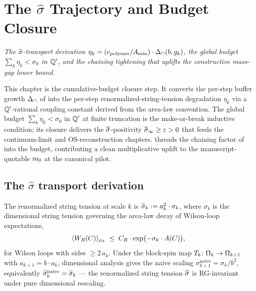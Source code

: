 %

\chapter{The
  \texorpdfstring{$\widehat\sigma$}{sigma-hat} Trajectory and
  Budget Closure}
\label{ch:sigma-hat-trajectory}

\noindent\emph{The $\widehat{\sigma}$-transport derivation
$\eta_k = (c_{\mathrm{polymer}} / A_{\min}) \cdot \Delta_{\cap}(b, g_k)$, the global
budget $\sum_k \eta_k < \sigma_0$ in $\mathbb{Q}'$, and the chaining
tightening that uplifts the constructive mass-gap lower bound.}

This chapter is the cumulative-budget closure step.  It converts
the per-step buffer growth $\Delta_{\cap}$ of  into the
per-step renormalized-string-tension degradation $\eta_k$ via a
$\mathbb{Q}'$-rational coupling constant derived from the area-law
convention.  The global budget $\sum_k \eta_k < \sigma_0$ in $\mathbb{Q}'$
at finite truncation is the make-or-break inductive condition; its
closure delivers the $\widehat{\sigma}$-positivity $\widehat{\sigma}_\infty \ge \varepsilon
> 0$ that feeds the continuum-limit and OS-reconstruction chapters.
 threads the chaining factor of
 into the budget, contributing a clean
multiplicative uplift to the manuscript-quotable $m_0$ at the
canonical pilot.

\section{The
  \texorpdfstring{$\widehat\sigma$}{sigma-hat} transport derivation}
\label{sec:sigma-hat-transport}

%

The renormalized string tension at scale $k$ is
$\widehat{\sigma}_k := a_k^2 \cdot \sigma_k$, where $\sigma_k$ is the dimensional
string tension governing the area-law decay of Wilson-loop
expectations,
\begin{equation}
  \label{eq:wilson-area-law}
  \langle W_R(C) \rangle_{\mu_k}
  \;\le\;
  C_R \cdot \exp\bigl(-\sigma_k \cdot A(C)\bigr),
\end{equation}
for Wilson loops with sides $\ge 2\,a_k$.  Under the block-spin
map $T_b \colon \Omega_k \to \Omega_{k+1}$ with $a_{k+1} = b \cdot a_k$,
dimensional analysis gives the naive
scaling $\sigma_{k+1}^{\mathrm{naive}} = \sigma_k / b^2$, equivalently
$\widehat{\sigma}_k^{\mathrm{naive}} = \widehat{\sigma}_k$ — the renormalized string tension
$\widehat{\sigma}$ is RG-invariant under pure dimensional rescaling.

